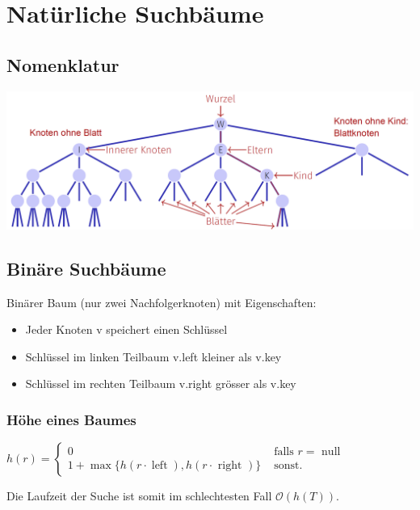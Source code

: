 \section{Natürliche Suchbäume}
\vspace{-4pt}
\begin{sectionbox}
\subsection{Nomenklatur}
\begin{center}
    \includegraphics[width = \columnwidth]{../img/BaumNomen.png}
\end{center}
\end{sectionbox}
\vspace{-4pt}
\begin{sectionbox}
  \subsection{Binäre Suchbäume}\smallskip
  Binärer Baum (nur zwei Nachfolgerknoten) mit Eigenschaften:\par
  \begin{itemize}
      \item Jeder Knoten v speichert einen Schlüssel
      \item Schlüssel im linken Teilbaum v.left kleiner als v.key
      \item Schlüssel im rechten Teilbaum v.right grösser als v.key
  \end{itemize}\vspace{7px}
  
  \subsubsection{Höhe eines Baumes}\smallskip
  $h(r)=\left\{\begin{array}{ll}0 & \text { falls } r=\text { null } \\ 1+\max \{h(r \cdot \operatorname{left}), h(r \cdot \text { right })\} & \text { sonst. }\end{array}\right.$\par\smallskip
  Die Laufzeit der Suche ist somit im schlechtesten Fall $\mathcal{O}(h(T))$.\par\smallskip
  \end{sectionbox}

